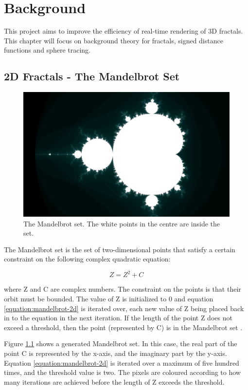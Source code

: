 \chapter{Background}
\label{chapter1}

This project aims to improve the efficiency of real-time rendering of 3D fractals. This chapter will focus on background theory for fractals, signed distance functions and sphere tracing.

\section{2D Fractals - The Mandelbrot Set}

\begin{figure} \label{figure:mandelbrot-2d-full}
	\centering
	\includegraphics[width=0.75\linewidth]{Images/Mandelbrot-2D-Full.png}
	\caption{The Mandelbrot set. The white points in the centre are inside the set.}
\end{figure}

The Mandelbrot set is the set of two-dimensional points that satisfy a certain constraint on the following complex quadratic equation:

\begin{equation} \label{equation:mandelbrot-2d}
	Z = {Z^2} + C
\end{equation}

where Z and C are complex numbers. The constraint on the points is that their orbit must be bounded. The value of Z is initialized to 0 and equation \ref{equation:mandelbrot-2d} is iterated over, each new value of Z being placed back in to the equation in the next iteration. If the length of the point Z does not exceed a threshold, then the point (represented by C) is in the Mandelbrot set \cite{devaney1999mandelbrot}.

Figure \ref{figure:mandelbrot-2d-full} shows a generated Mandelbrot set. In this case, the real part of the point C is represented by the x-axis, and the imaginary part by the y-axis. Equation \ref{equation:mandelbrot-2d} is iterated over a maximum of five hundred times, and the threshold value is two. The pixels are coloured according to how many iterations are achieved before the length of Z exceeds the threshold.

